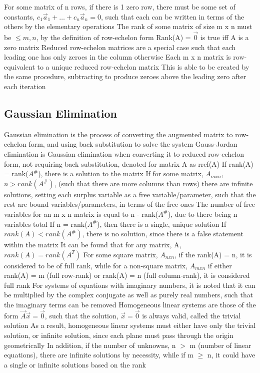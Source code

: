 \documentclass[11 pt, twoside]{article}
\newenvironment{outline*}
{
	\begin{outline}[enumerate]
	}
	{\end{outline}
}
\begin{document}
\begin{outline*}
\2 For some matrix of n rows, if there is 1 zero row, there must be some set of constants, $c_1\vec{a}_1 + \dots + c_n\vec{a}_n = 0$, such that each can be written in terms of the others by the elementary operations
\2 The rank of some matrix of size m x n must be $\leq m, n$, by the definition of row-echelon form
\2 Rank(A) = $\vec{0}$ is true iff A is a zero matrix
\1 Reduced row-echelon matrices are a special case such that each leading one has only zeroes in the column otherwise
\2 Each m x n matrix is row-equivalent to a unique reduced row-echelon matrix
\2 This is able to be created by the same procedure, subtracting to produce zeroes above the leading zero after each iteration
\end{outline*}
\subsection{Gaussian Elimination}
\begin{outline*}
\1 Gaussian elimination is the process of converting the augmented matrix to row-echelon form, and using back substitution to solve the system 
\2 Gauss-Jordan elimination is Gaussian elimination when converting it to reduced row-echelon form, not requiring back substitution, denoted for matrix A as rref(A)
\2 If rank(A) = rank($A^\#$), there is a solution to the matrix
\3 If for some matrix, $A_{mxn}$, $n > rank(A^\#)$, (such that there are more columns than rows) there are infinite solutions, setting each surplus variable as a free variable/parameter, such that the rest are bound variables/parameters, in terms of the free ones
\3 The number of free variables for an m x n matrix is equal to n - rank($A^\#$), due to there being n variables total
\3 If n = rank($A^\#$), then there is a single, unique solution
\2 If $rank(A) < rank(A^\#)$, there is no solution, since there is a false statement within the matrix
\2 It can be found that for any matrix, A, $rank(A) = rank(A^T)$
\2 For some square matrix, $A_{nxn}$, if the rank(A) = n, it is considered to be of full rank, while for a non-square matrix, $A_{mxn}$ if either rank(A) = m (full row-rank) or rank(A) = n (full column-rank), it is considered full rank
\1 For systems of equations with imaginary numbers, it is noted that it can be multiplied by the complex conjugate as well as purely real numbers, such that the imaginary terms can be removed
\1 Homogeneous linear systems are those of the form $\vec{A}\vec{x} = \vec{0}$, such that the solution, $\vec{x} = \vec{0}$ is always valid, called the trivial solution
\2 As a result, homogeneous linear systems must either have only the trivial solution, or infinite solution, since each plane must pass through the origin geometrically
\2 In addition, if the number of unknowns, n $>$ m (number of linear equations), there are infinite solutions by necessity, while if m $\geq$ n, it could have a single or infinite solutions based on the  rank
\end{outline*}
\end{document}
